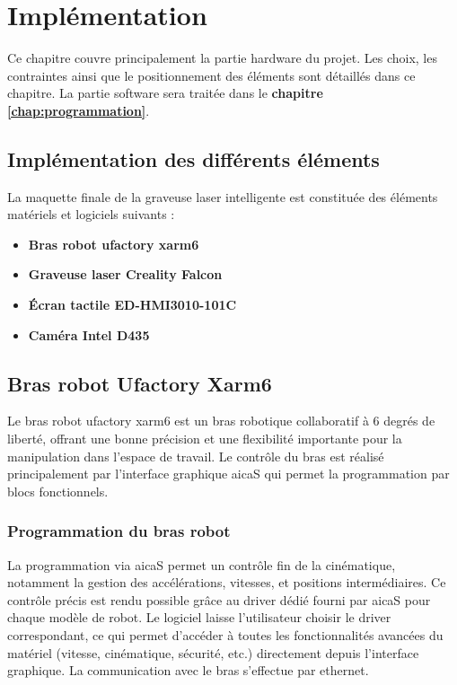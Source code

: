 \chapter{Implémentation}
\label{chap:implémentation}

Ce chapitre couvre principalement la partie \gls{hardware} du projet. Les choix, les contraintes ainsi que le positionnement des éléments sont détaillés dans ce chapitre. La partie \gls{software} sera traitée dans le \textbf{chapitre \ref{chap:programmation}}.

\section{Implémentation des différents éléments}

La maquette finale de la graveuse laser intelligente est constituée des éléments matériels et logiciels suivants :

\begin{itemize}
    \item \textbf{Bras robot \gls{ufactory} \gls{xarm6}}
    \item \textbf{Graveuse laser Creality Falcon}
    \item \textbf{Écran tactile \gls{ED-HMI3010-101C}}
    \item \textbf{Caméra Intel D435}
\end{itemize}

\section{Bras robot Ufactory Xarm6}
Le bras robot \gls{ufactory} \gls{xarm6} est un bras robotique collaboratif à 6 degrés de liberté, offrant une bonne précision et une flexibilité importante pour la manipulation dans l'espace de travail. Le contrôle du bras est réalisé principalement par l’interface graphique \gls{aicaS} qui permet la programmation par blocs fonctionnels.

\subsection{Programmation du bras robot}
La programmation via \gls{aicaS} permet un contrôle fin de la cinématique, notamment la gestion des accélérations, vitesses, et positions intermédiaires. Ce contrôle précis est rendu possible grâce au \gls{driver} dédié fourni par \gls{aicaS} pour chaque modèle de robot. Le logiciel laisse l'utilisateur choisir le \gls{driver} correspondant, ce qui permet d’accéder à toutes les fonctionnalités avancées du matériel (vitesse, cinématique, sécurité, etc.) directement depuis l’interface graphique. La communication avec le bras s’effectue par ethernet.

